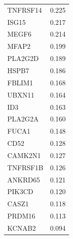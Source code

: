 \documentclass[a4paper,12pt]{article}
\begin{document}
\begin{longtable}{ll}
  TNFRSF14  & 0.225                                                                                 \\
  ISG15     & 0.217                                                                                 \\
  MEGF6     & 0.214                                                                                 \\
  MFAP2     & 0.199                                                                                 \\
  PLA2G2D   & 0.189                                                                                 \\
  HSPB7     & 0.186                                                                                 \\
  FBLIM1    & 0.168                                                                                 \\
  UBXN11    & 0.164                                                                                 \\
  ID3       & 0.163                                                                                 \\
  PLA2G2A   & 0.160                                                                                 \\
  FUCA1     & 0.148                                                                                 \\
  CD52      & 0.128                                                                                 \\
  CAMK2N1   & 0.127                                                                                 \\
  TNFRSF1B  & 0.126                                                                                 \\
  ANKRD65   & 0.121                                                                                 \\
  PIK3CD    & 0.120                                                                                 \\
  CASZ1     & 0.118                                                                                 \\
  PRDM16    & 0.113                                                                                 \\
  KCNAB2    & 0.094                                                                                 \\

\end{longtable}
\end{document}
